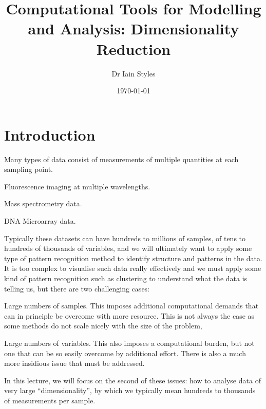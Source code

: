 \documentclass[12pt,a4paper]{tufte-handout}
\title{Computational Tools for Modelling and Analysis: Dimensionality Reduction}
\author{Dr Iain Styles}
\date{\today}
\begin{document}
\maketitle
\section{Introduction}
Many types of data consist of measurements of multiple quantities at each sampling point.
\begin{asparaitem}
  \item Fluorescence imaging at multiple wavelengths.
  \item Mass spectrometry data.
  \item DNA Microarray data.
\end{asparaitem}
Typically these datasets can have hundreds to millions of samples, of tens to hundreds of thousands of variables, and we will ultimately want to apply some type of pattern recognition method to identify structure and patterns in the data. It is too complex to visualise such data really effectively and we must apply some kind of pattern recognition such as clustering to understand what the data is telling us, but there are two challenging cases:
\begin{asparaitem}
  \item Large numbers of samples. This imposes additional computational demands that can in principle be overcome with more resource. This is not always the case as some methods do not scale nicely with the size of the problem,
  \item Large numbers of variables. This also imposes a computational burden, but not one that can be so easily overcome by additional effort. There is also a much more insidious issue that must be addressed.
\end{asparaitem}
In this lecture, we will focus on the second of these issues: how to analyse data of very large ``dimensionality'', by which we typically mean hundreds to thousands of measurements per sample.
\end{document}
